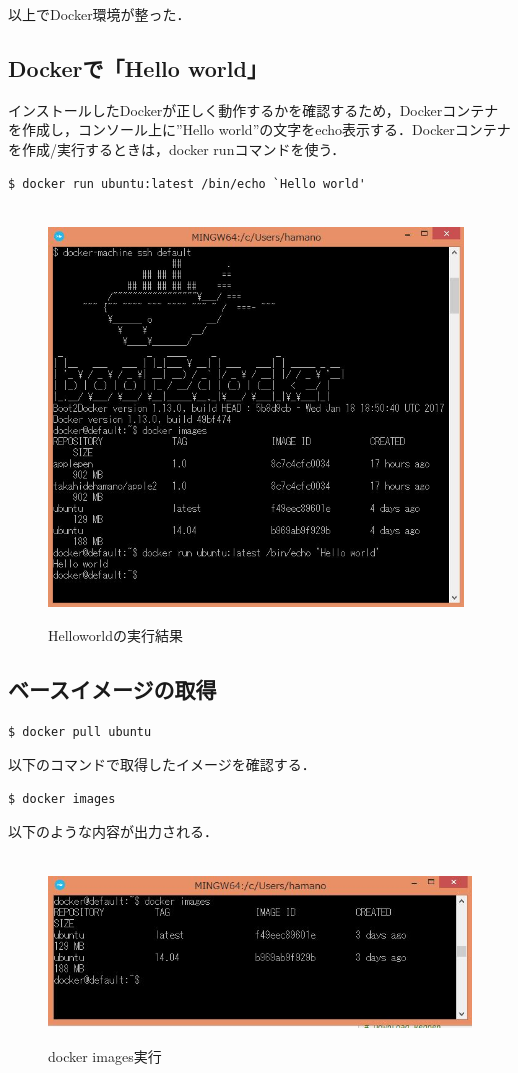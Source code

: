 以上でDocker環境が整った．

\newpage
\subsection{Dockerで「Hello world」}
インストールしたDockerが正しく動作するかを確認するため，Dockerコンテナを作成し，コンソール上に”Hello world”の文字をecho表示する．Dockerコンテナを作成/実行するときは，docker runコマンドを使う．
\begin{lstlisting}[basicstyle=\ttfamily\footnotesize, frame=single]
$ docker run ubuntu:latest /bin/echo `Hello world'
\end{lstlisting}

\begin{figure}[htb]
\centering　
\includegraphics[width=11cm]{27.JPG}
\caption{Helloworldの実行結果}\label{tab:uac}
\end{figure}
\newpage
\subsection{ベースイメージの取得}
\begin{lstlisting}[basicstyle=\ttfamily\footnotesize, frame=single]
$ docker pull ubuntu
\end{lstlisting}
以下のコマンドで取得したイメージを確認する．
\begin{lstlisting}[basicstyle=\ttfamily\footnotesize, frame=single]
$ docker images
\end{lstlisting}
以下のような内容が出力される．
\begin{figure}[htb]
\centering　
\includegraphics[width=14cm]{10.JPG}
\caption{docker images実行}\label{tab:uac}
\end{figure}

